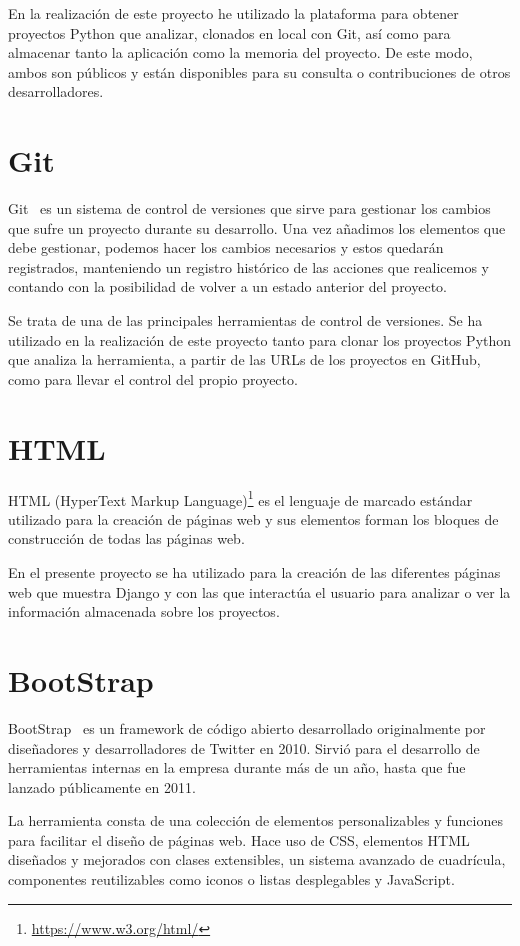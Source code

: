 \documentclass[a4paper, 12pt]{book}
\begin{document}
En la realización de este proyecto he utilizado la plataforma para obtener proyectos Python que analizar, clonados en local con Git, así como para almacenar tanto la aplicación como la memoria del proyecto. De este modo, ambos son públicos y están disponibles para su consulta o contribuciones de otros desarrolladores.

\section{Git} 
\label{sec:seccion5}
Git~\cite{git:_git} es un sistema de control de versiones que sirve para gestionar los cambios que sufre un proyecto durante su desarrollo. Una vez añadimos los elementos que debe gestionar, podemos hacer los cambios necesarios y estos quedarán registrados, manteniendo un registro histórico de las acciones que realicemos y contando con la posibilidad de volver a un estado anterior del proyecto.

Se trata de una de las principales herramientas de control de versiones. Se ha utilizado en la realización de este proyecto tanto para clonar los proyectos Python que analiza la herramienta, a partir de las URLs de los proyectos en GitHub, como para llevar el control del propio proyecto.

\section{HTML} 
\label{sec:seccion6}
HTML (HyperText Markup Language)\footnote{\url{https://www.w3.org/html/}} es el lenguaje de marcado estándar utilizado para la creación de páginas web y sus elementos forman los bloques de construcción de todas las páginas web.~\cite{robson:_html_css}

En el presente proyecto se ha utilizado para la creación de las diferentes páginas web que muestra Django y con las que interactúa el usuario para analizar o ver la información almacenada sobre los proyectos.

\section{BootStrap} 
\label{sec:seccion7}
BootStrap~\cite{bootstrap:_bootstrap} es un framework de código abierto desarrollado originalmente por diseñadores y desarrolladores de Twitter en 2010. Sirvió para el desarrollo de herramientas internas en la empresa durante más de un año, hasta que fue lanzado públicamente en 2011.

La herramienta consta de una colección de elementos personalizables y funciones para facilitar el diseño de páginas web. Hace uso de CSS, elementos HTML diseñados y mejorados con clases extensibles, un sistema avanzado de cuadrícula, componentes reutilizables como iconos o listas desplegables y JavaScript.
\end{document}
